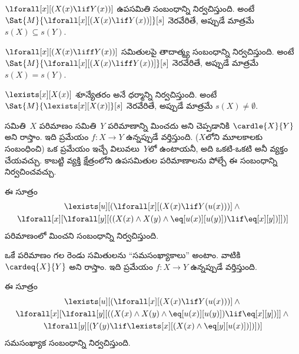 \documentclass[../../../include/open-logic-section]{subfiles}
\begin{document}


\begin{prop}
 $\lforall[x][(X(x) \lif Y(x))]$ ఉపసమితి
సంబంధాన్ని నిర్వచిస్తుంది. అంటే
$\Sat{M}{\lforall[x][(X(x) \lif Y(x))]}[s]$ నెరవేరితే, అప్పుడే మాత్రమే $s(X)
\subseteq s(Y)$.
\end{prop}

\begin{prop}
 $\lforall[x][(X(x) \liff Y(x))]$ సమితులపై
తాదాత్మ్య సంబంధాన్ని నిర్వచిస్తుంది. అంటే
$\Sat{M}{\lforall[x][(X(x) \liff Y(x))]}[s]$ నెరవేరితే, అప్పుడే మాత్రమే
$s(X) = s(Y)$.
\end{prop}

\begin{prop}
 $\lexists[x][X(x)]$ శూన్యేతరం అనే ధర్మాన్ని
నిర్వచిస్తుంది. అంటే $\Sat{M}{\lexists[x][X(x)]}[s]$ నెరవేరితే, అప్పుడే మాత్రమే
$s(X) \neq \emptyset$.
\end{prop}

సమితి~$X$ పరిమాణం సమితి~$Y$ పరిమాణాన్ని మించదు అని చెప్పడానికి
$\cardle{X}{Y}$ అని రాస్తాం. ఇది  ప్రమేయం
$f\colon X \to Y$ ఉన్నప్పుడే వర్తిస్తుంది. ($X$లోని మూలకాలకు సంబంధించి)
ఒక ప్రమేయం ఇచ్చే విలువలు~$Y$లో ఉంటాయనీ, అది ఒకటి-ఒకటి అనీ వ్యక్తం
చేయవచ్చు. కాబట్టి వ్యక్తి క్షేత్రంలోని ఉపసమితుల పరిమాణాలను
పోల్చే ఈ సంబంధాన్ని నిర్వచించవచ్చు.

\begin{prop}
ఈ సూత్రం
\begin{multline*}
\lexists[u][(\lforall[x][(X(x) \lif Y(u(x)))] \land {}\\
\lforall[x][\lforall[y][((X(x) \land X(y) \land \eq[u(x)][u(y)]) \lif
      \eq[x][y])]])]
\end{multline*}
పరిమాణంలో మించని సంబంధాన్ని నిర్వచిస్తుంది.
\end{prop}

ఒకే పరిమాణం గల రెండు సమితులను “సమసంఖ్యాకాలు” అంటాం.
వాటికి $\cardeq{X}{Y}$ అని రాస్తాం. ఇది  ప్రమేయం
$f\colon X \to Y$ ఉన్నప్పుడే వర్తిస్తుంది.

\begin{prop}
ఈ సూత్రం
\begin{multline*}
  \lexists[u][(\lforall[x][(X(x) \lif Y(u(x)))] \land {}\\
    \lforall[x][\lforall[y][((X(x) \land X(y) \land
      \eq[u(x)][u(y)]) \lif \eq[x][y])]]
  \land {} \\\lforall[y][(Y(y) \lif \lexists[x][(X(x)
      \land \eq[y][u(x)])])])]
\end{multline*}
సమసంఖ్యాక సంబంధాన్ని నిర్వచిస్తుంది.
\end{prop}
\end{document}
